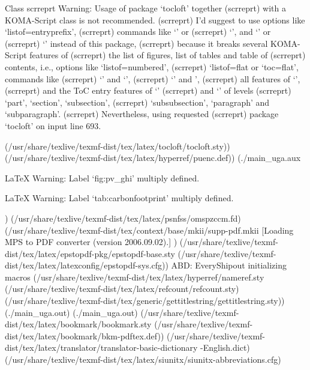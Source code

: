 Class scrreprt Warning: Usage of package `tocloft' together
(scrreprt)              with a KOMA-Script class is not recommended.
(scrreprt)              I'd suggest to use options like `listof=entryprefix',
(scrreprt)              commands like `\listoflofentryname' or
(scrreprt)              `\listoflotentryname', and `\DeclareTOCStyleEntry' or
(scrreprt)              `\RedeclareSectionCommand' instead of this package,
(scrreprt)              because it breaks several KOMA-Script features of
(scrreprt)              the list of figures, list of tables and table of
(scrreprt)              contents, i.e., options like `listof=numbered',
(scrreprt)              `listof=flat or `toc=flat', commands like
(scrreprt)              `' and `',
(scrreprt)              `' and ',
(scrreprt)              all features of `\DeclareTOCStyleEntry',
(scrreprt)              and the ToC entry features of `\DeclareSecionCommand'
(scrreprt)              and `\RedeclareSectionCommand' of levels
(scrreprt)              `part', `section', `subsection',
(scrreprt)              `subsubsection', `paragraph' and `subparagraph'.
(scrreprt)              Nevertheless, using requested
(scrreprt)              package `tocloft' on input line 693.

(/usr/share/texlive/texmf-dist/tex/latex/tocloft/tocloft.sty))
(/usr/share/texlive/texmf-dist/tex/latex/hyperref/puenc.def)) (./main_uga.aux

LaTeX Warning: Label `fig:pv_ghi' multiply defined.


LaTeX Warning: Label `tab:carbonfootprint' multiply defined.

) (/usr/share/texlive/texmf-dist/tex/latex/psnfss/omspzccm.fd)
(/usr/share/texlive/texmf-dist/tex/context/base/mkii/supp-pdf.mkii
[Loading MPS to PDF converter (version 2006.09.02).]
) (/usr/share/texlive/texmf-dist/tex/latex/epstopdf-pkg/epstopdf-base.sty
(/usr/share/texlive/texmf-dist/tex/latex/latexconfig/epstopdf-sys.cfg))
ABD: EveryShipout initializing macros
(/usr/share/texlive/texmf-dist/tex/latex/hyperref/nameref.sty
(/usr/share/texlive/texmf-dist/tex/latex/refcount/refcount.sty)
(/usr/share/texlive/texmf-dist/tex/generic/gettitlestring/gettitlestring.sty))
(./main_uga.out) (./main_uga.out)
(/usr/share/texlive/texmf-dist/tex/latex/bookmark/bookmark.sty
(/usr/share/texlive/texmf-dist/tex/latex/bookmark/bkm-pdftex.def))
(/usr/share/texlive/texmf-dist/tex/latex/translator/translator-basic-dictionary
-English.dict)
(/usr/share/texlive/texmf-dist/tex/latex/siunitx/siunitx-abbreviations.cfg)

